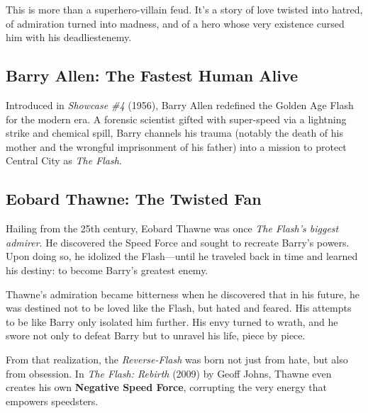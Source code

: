 This is more than a superhero-villain feud. It’s a story of love twisted into hatred, of admiration turned into madness, and of a hero whose very existence cursed him with his deadliestenemy.


\subsection*{Barry Allen: The Fastest Human Alive}
Introduced in \textit{Showcase \#4} (1956), Barry Allen redefined the Golden Age Flash for the modern era. A forensic scientist gifted with super-speed via a lightning strike and chemical spill, Barry channels his trauma (notably the death of his mother and the wrongful imprisonment of his father) into a mission to protect Central City as \textit{The Flash}.

\subsection*{Eobard Thawne: The Twisted Fan}
Hailing from the 25th century, Eobard Thawne was once \textit{The Flash’s biggest admirer}. He discovered the Speed Force and sought to recreate Barry’s powers. Upon doing so, he idolized the Flash---until he traveled back in time and learned his destiny: to become Barry’s greatest enemy.

Thawne’s admiration became bitterness when he discovered that in his future, he was destined not to be loved like the Flash, but hated and feared. His attempts to be like Barry only isolated him further. His envy turned to wrath, and he swore not only to defeat Barry but to unravel his life, piece by piece.

From that realization, the \textit{Reverse-Flash} was born not just from hate, but also from obsession. In \textit{The Flash: Rebirth} (2009) by Geoff Johns, Thawne even creates his own \textbf{Negative Speed Force}, corrupting the very energy that empowers speedsters.

